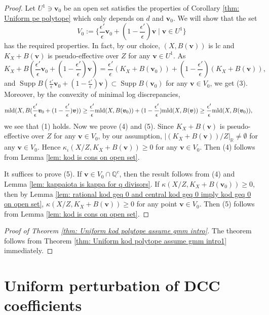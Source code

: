 \documentclass[11pt]{amsart}
\numberwithin{equation}{section}
\newcommand{\Qq}{\mathbb{Q}}
\newcommand{\mld}{{\rm{mld}}}
\newcommand{\Supp}{\operatorname{Supp}}
\theoremstyle{definition}
\theoremstyle{definition}
\begin{document}
\begin{proof}
Let $U^1\ni \bm{v}_0$ be an open set satisfies the properties of Corollary \ref{thm: Uniform pe polytope} which only depends on $d$ and $\bm{v}_0$. We will show that the set
$$V_0:=\{\frac{\epsilon'}{\epsilon}\bm{v}_0+(1-\frac{\epsilon'}{\epsilon})\bm{v}\mid \bm{v}\in U^1\}$$
has the required properties. In fact, by our choice, $(X,B(\bm{v}))$ is lc and $K_X+B(\bm{v})$ is pseudo-effective over $Z$ for any $\bm{v}\in U^1$. As
$$K_X+B(\frac{\epsilon'}{\epsilon}\bm{v}_0+(1-\frac{\epsilon'}{\epsilon})\bm{v})=\frac{\epsilon'}{\epsilon}(K_X+B(\bm{v}_0))+(1-\frac{\epsilon'}{\epsilon})(K_X+B(\bm{v})),$$
and $\Supp B(\frac{\epsilon'}{\epsilon}\bm{v}_0+(1-\frac{\epsilon'}{\epsilon})\bm{v})\subset\Supp B(\bm{v}_0)$ for any $\bm{v}\in V_0$, we get (3). Moreover, by the convexity of minimal log discrepancies, 
\begin{align*}
    \mld(X,B(\frac{\epsilon'}{\epsilon}\bm{v}_0+(1-\frac{\epsilon'}{\epsilon})\bm{v}))&\geq\frac{\epsilon'}{\epsilon}\mld(X,B(\bm{v}_0))+(1-\frac{\epsilon'}{\epsilon})\mld(X,B(\bm{v}))
    \geq\frac{\epsilon'}{\epsilon}\mld(X,B(\bm{v}_0)),
\end{align*}
we see that (1) holds. Now we prove (4) and (5). Since $K_X+B(\bm{v})$ is pseudo-effective over $Z$ for any $\bm{v}\in V_0$, by our assumption, $|(K_X+B(\bm{v}))/Z|_{\mathbb R}\not=\emptyset$ for any $\bm{v}\in V_0$. Hence $\kappa_{\iota}(X/Z,K_X+B(\bm{v}))\geq 0$ for any  $\bm{v}\in V_0$. Then (4) follows from Lemma \ref{lem: kod is cons on open set}. 

It suffices to prove (5). If $\bm{v}\in V_0\cap\Qq^c$, then the result follows from (4) and Lemma \ref{lem: kappaiota is kappa for q divisors}. If $\kappa(X/Z,K_X+B(\bm{v}_0))\geq 0$, then by Lemma \ref{lem: rational kod geq 0 and central kod geq 0 imply kod geq 0 on open set},  $\kappa(X/Z,K_X+B(\bm{v}))\geq 0$ for any point $\bm{v}\in V_0$. Then (5) follows from Lemma \ref{lem: kod is cons on open set}.
\end{proof}

\begin{proof}[Proof of Theorem \ref{thm: Uniform kod polytope assume gmm intro}]
The theorem follows from Theorem \ref{thm: Uniform kod polytope assume gmm intro1} immediately.
\end{proof}



\section{Uniform perturbation of DCC coefficients}\label{sec5}
\end{document}
